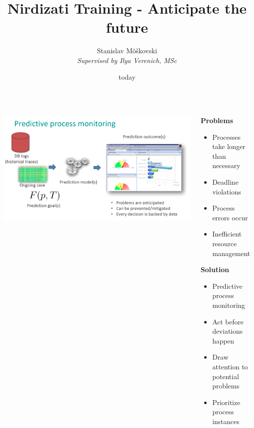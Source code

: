 \documentclass[24pt, a0paper, landscape]{tikzposter}
\title{Nirdizati Training - Anticipate the future}
\author{Stanislav Mõškovski\\{\small \textit{Supervised by Ilya Verenich, MSc}}}
\date{today}
\institute{Institute of Computer Science, University of Tartu}
\begin{document}
    \maketitle

    \begin{columns}
        \block{}
        {
        \begin{tikzfigure}
            \includegraphics[scale=0.9]{figures/ppm.png}
        \end{tikzfigure}
        }

        \block{}
        {

        \begin{multicols}{2}
            {\huge\textbf{Problems}}
            \bigskip

            \begin{itemize}
                \item Processes take longer than necessary
                \item Deadline violations
                \item Process errors occur
                \item Inefficient resource management
            \end{itemize}
            \columnbreak

            {\huge\textbf{Solution}}
            \bigskip
            \begin{itemize}
                \item Predictive process monitoring
                \item Act before deviations happen
                \item Draw attention to potential problems
                \item Prioritize process instances
            \end{itemize}


\end{multicols}}
\end{columns}
\end{document}
